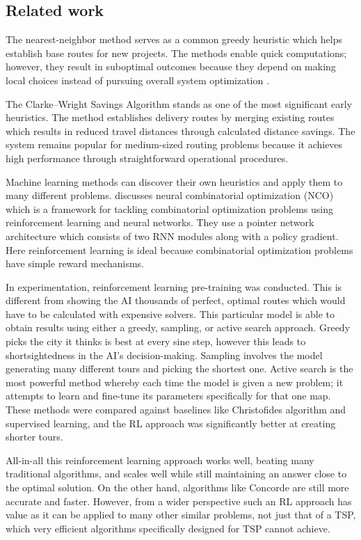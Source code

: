 \documentclass[conference]{IEEEtran}
\begin{document}
\subsection{Related work}

The nearest-neighbor method serves as a common greedy heuristic which helps establish base routes for new projects. The methods enable quick computations; however, they result in suboptimal outcomes because they depend on making local choices instead of pursuing overall system optimization \cite{Golden2008}.

The Clarke--Wright Savings Algorithm \cite{ClarkeWright1964} stands as one of the most significant early heuristics. The method establishes delivery routes by merging existing routes which results in reduced travel distances through calculated distance savings. The system remains popular for medium-sized routing problems because it achieves high performance through straightforward operational procedures.

Machine learning methods can discover their own heuristics and apply them to many different problems. \cite{Bello2017} discusses neural combinatorial optimization (NCO) which is a framework for tackling combinatorial optimization problems using reinforcement learning and neural networks. They use a pointer network architecture which consists of two RNN modules along with a policy gradient. Here reinforcement learning is ideal because combinatorial optimization problems have simple reward mechanisms.

In experimentation, reinforcement learning pre-training was conducted. This is different from showing the AI thousands of perfect, optimal routes which would have to be calculated with expensive solvers. This particular model is able to obtain results using either a greedy, sampling, or active search approach. Greedy picks the city it thinks is best at every sine step, however this leads to shortsightedness in the AI's decision-making. Sampling involves the model generating many different tours and picking the shortest one. Active search is the most powerful method whereby each time the model is given a new problem; it attempts to learn and fine-tune its parameters specifically for that one map. These methods were compared against baselines like Christofides algorithm and supervised learning, and the RL approach was significantly better at creating shorter tours.

All-in-all this reinforcement learning approach works well, beating many traditional algorithms, and scales well while still maintaining an answer close to the optimal solution. On the other hand, algorithms like Concorde are still more accurate and faster. However, from a wider perspective such an RL approach has value as it can be applied to many other similar problems, not just that of a TSP, which very efficient algorithms specifically designed for TSP cannot achieve.
\end{document}
